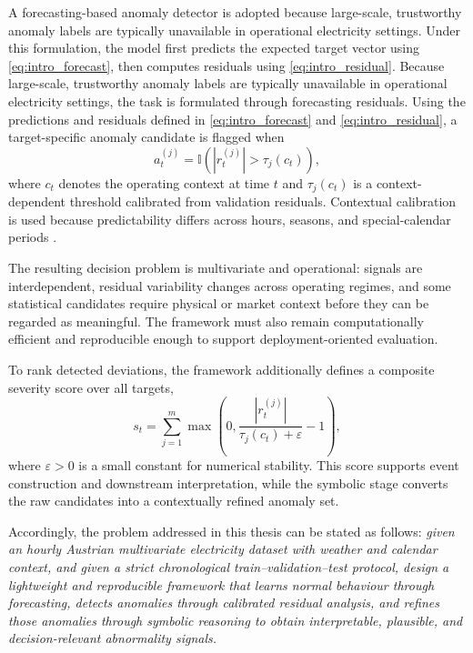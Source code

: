 A forecasting-based anomaly detector is adopted because large-scale, trustworthy anomaly labels are typically unavailable in operational electricity settings. Under this formulation, the model first predicts the expected target vector using \eqref{eq:intro_forecast}, then computes residuals using \eqref{eq:intro_residual}. Because large-scale, trustworthy anomaly labels are typically unavailable in
operational electricity settings, the task is formulated through forecasting residuals.
Using the predictions and residuals defined in
\eqref{eq:intro_forecast} and \eqref{eq:intro_residual}, a target-specific
anomaly candidate is flagged when
\begin{equation}
a_{t}^{(j)} = \mathbb{I}\!\left(\left|r_{t}^{(j)}\right| > \tau_j(c_t)\right),
\label{eq:intro_threshold}
\end{equation}
where $c_t$ denotes the operating context at time $t$ and $\tau_j(c_t)$ is a
context-dependent threshold calibrated from validation residuals. Contextual
calibration is used because predictability differs across hours, seasons, and
special-calendar periods
\cite{hong2016probabilistic,weron2014electricity,shafer2008tutorial}.

The resulting decision problem is multivariate and operational: signals are
interdependent, residual variability changes across operating regimes, and some
statistical candidates require physical or market context before they can be
regarded as meaningful. The framework must also remain computationally efficient
and reproducible enough to support deployment-oriented evaluation.

To rank detected deviations, the framework additionally defines a composite severity score over all targets,
\begin{equation}
s_t = \sum_{j=1}^{m} \max\!\left(0, \frac{\left|r_t^{(j)}\right|}{\tau_j(c_t)+\varepsilon} - 1\right),
\label{eq:intro_score}
\end{equation}
where $\varepsilon > 0$ is a small constant for numerical stability. This score
supports event construction and downstream interpretation, while the symbolic
stage converts the raw candidates into a contextually refined anomaly set.

Accordingly, the problem addressed in this thesis can be stated as follows: \emph{given an hourly Austrian multivariate electricity dataset with weather and calendar context, and given a strict chronological train--validation--test protocol, design a lightweight and reproducible framework that learns normal behaviour through forecasting, detects anomalies through calibrated residual analysis, and refines those anomalies through symbolic reasoning to obtain interpretable, plausible, and decision-relevant abnormality signals.}

